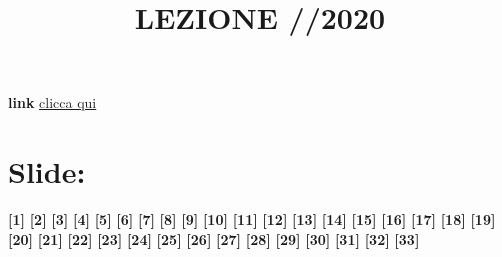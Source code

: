 \title{LEZIONE //2020}\newline
\textbf{link} \href{}{clicca qui}
\section*{Slide: }
\textbf{[1]}\;
\newline\textbf{[2]}\;
\newline\textbf{[3]}\;
\newline\textbf{[4]}\;
\newline\textbf{[5]}\;
\newline\textbf{[6]}\;
\newline\textbf{[7]}\;
\newline\textbf{[8]}\;
\newline\textbf{[9]}\;
\newline\textbf{[10]}\;
\newline\textbf{[11]}\;
\newline\textbf{[12]}\;
\newline\textbf{[13]}\;
\newline\textbf{[14]}\;
\newline\textbf{[15]}\;
\newline\textbf{[16]}\;
\newline\textbf{[17]}\;
\newline\textbf{[18]}\;
\newline\textbf{[19]}\;
\newline\textbf{[20]}\;
\newline\textbf{[21]}\;
\newline\textbf{[22]}\;
\newline\textbf{[23]}\;
\newline\textbf{[24]}\;
\newline\textbf{[25]}\;
\newline\textbf{[26]}\;
\newline\textbf{[27]}\;
\newline\textbf{[28]}\;
\newline\textbf{[29]}\;
\newline\textbf{[30]}\;
\newline\textbf{[31]}\;
\newline\textbf{[32]}\;
\newline\textbf{[33]}\;